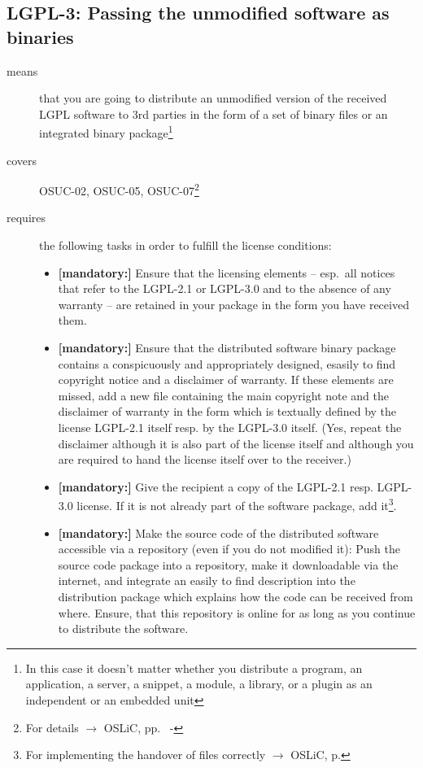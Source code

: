 \subsection{LGPL-3: Passing the unmodified software as binaries} 

\begin{description}
\item[means] that you are going to distribute an unmodified version of the
received LGPL software to 3rd parties in the form of a set of binary files or an
integrated bi\-na\-ry package\footnote{In this case it doesn't matter
whether you  distribute a program, an application, a server, a snippet, a
module, a library, or a plugin as an independent or an embedded unit}

\item[covers] OSUC-02, OSUC-05, OSUC-07\footnote{For details $\rightarrow$ OSLiC, pp.\
\pageref{OSUC-02-DEF} - \pageref{OSUC-07-DEF}}

\item[requires] the following tasks in order to fulfill the license conditions:
\begin{itemize}
  
  \item \textbf{[mandatory:]} Ensure that the licensing elements -- esp.\ all
  notices that refer to the LGPL-2.1 or LGPL-3.0 and to the absence of any
  warranty -- are retained in your package in the form you have received them.

  \item \textbf{[mandatory:]} Ensure that the distributed software binary
  package contains a conspicuously and appropriately designed, esasily to find
  copyright notice and a disclaimer of warranty. If these elements are missed,
  add a new file containing the main copyright note and the disclaimer of
  warranty in the form which is textually defined by the license LGPL-2.1 itself
  resp. by the LGPL-3.0 itself. (Yes, repeat the disclaimer although it is also
  part of the license itself and although you are required to hand the license
  itself over to the receiver.)
  
  \item \textbf{[mandatory:]} Give the recipient a copy of the LGPL-2.1 resp.
  LGPL-3.0 license. If it is not already part of the software package, add
  it\footnote{For implementing the handover of files correctly $\rightarrow$
  OSLiC, p. \pageref{DistributingFilesHint}}.
  
  \item \textbf{[mandatory:]} Make the source code of the distributed software
  accessible via a repository (even if you do not modified it): Push the source
  code package into a repository, make it downloadable via the internet, and
  integrate an easily to find description into the distribution package which
  explains how the code can be received from where. Ensure, that this
  repository is online for as long as you continue to distribute the software.
  

\end{itemize}
\end{description}
